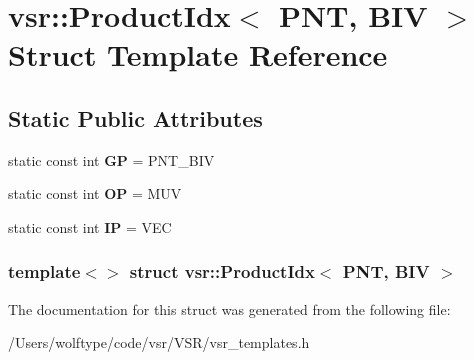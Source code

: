 \hypertarget{structvsr_1_1_product_idx_3_01_p_n_t_00_01_b_i_v_01_4}{\section{vsr\-:\-:Product\-Idx$<$ P\-N\-T, B\-I\-V $>$ Struct Template Reference}
\label{structvsr_1_1_product_idx_3_01_p_n_t_00_01_b_i_v_01_4}
}
\subsection*{Static Public Attributes}
\begin{DoxyCompactItemize}
\item 
\hypertarget{structvsr_1_1_product_idx_3_01_p_n_t_00_01_b_i_v_01_4_adede324134c5b4e1a575290d68789b35}{static const int {\bfseries G\-P} = P\-N\-T\-\_\-\-B\-I\-V}\label{structvsr_1_1_product_idx_3_01_p_n_t_00_01_b_i_v_01_4_adede324134c5b4e1a575290d68789b35}

\item 
\hypertarget{structvsr_1_1_product_idx_3_01_p_n_t_00_01_b_i_v_01_4_a4e9a3fb99e566982efaf65c6f5c1440b}{static const int {\bfseries O\-P} = M\-U\-V}\label{structvsr_1_1_product_idx_3_01_p_n_t_00_01_b_i_v_01_4_a4e9a3fb99e566982efaf65c6f5c1440b}

\item 
\hypertarget{structvsr_1_1_product_idx_3_01_p_n_t_00_01_b_i_v_01_4_afcff38f31222f83d068c536bdebc15ed}{static const int {\bfseries I\-P} = V\-E\-C}\label{structvsr_1_1_product_idx_3_01_p_n_t_00_01_b_i_v_01_4_afcff38f31222f83d068c536bdebc15ed}

\end{DoxyCompactItemize}
\subsubsection*{template$<$$>$ struct vsr\-::\-Product\-Idx$<$ P\-N\-T, B\-I\-V $>$}



The documentation for this struct was generated from the following file\-:\begin{DoxyCompactItemize}
\item 
/\-Users/wolftype/code/vsr/\-V\-S\-R/vsr\-\_\-templates.\-h\end{DoxyCompactItemize}
